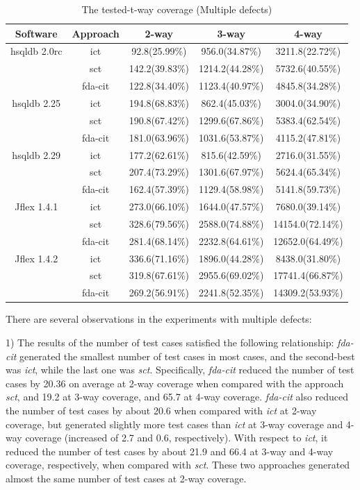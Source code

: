 \documentclass[journal,12pt,onecolumn,draftclsnofoot,]{IEEEtran}
\begin{document}
\begin{table}[ht]
\caption{The tested-t-way coverage (Multiple defects)}
\label{multiple_tdefects_tested-t-way}
\centering
\begin{tabular}{|c|c|c|c|c|} \hline
Software&  Approach & 2-way & 3-way & 4-way\\ \hline
hsqldb 2.0rc	&ict	&92.8(25.99\%)	&956.0(34.87\%)	&3211.8(22.72\%)	\\
	&sct	&142.2(39.83\%)	&1214.2(44.28\%)	&5732.6(40.55\%)	\\
	&fda-cit	&122.8(34.40\%)	&1123.4(40.97\%)	&4845.8(34.28\%)	\\  \hline
hsqldb 2.25	&ict	&194.8(68.83\%)	&862.4(45.03\%)	&3004.0(34.90\%)	\\
	&sct	&190.8(67.42\%)	&1299.6(67.86\%)	&5383.4(62.54\%)	\\
	&fda-cit	&181.0(63.96\%)	&1031.6(53.87\%)	&4115.2(47.81\%)	\\  \hline
hsqldb 2.29	&ict	&177.2(62.61\%)	&815.6(42.59\%)	&2716.0(31.55\%)	\\
	&sct	&207.4(73.29\%)	&1301.6(67.97\%)	&5624.4(65.34\%)	\\
	&fda-cit	&162.4(57.39\%)	&1129.4(58.98\%)	&5141.8(59.73\%)	\\  \hline
Jflex 1.4.1	&ict	&273.0(66.10\%)	&1644.0(47.57\%)	&7680.0(39.14\%)	\\
	&sct	&328.6(79.56\%)	&2588.0(74.88\%)	&14154.0(72.14\%)	\\
	&fda-cit	&281.4(68.14\%)	&2232.8(64.61\%)	&12652.0(64.49\%)	\\  \hline
Jflex 1.4.2	&ict	&336.6(71.16\%)	&1896.0(44.28\%)	&8438.0(31.80\%)	\\
	&sct	&319.8(67.61\%)	&2955.6(69.02\%)	&17741.4(66.87\%)	\\
	&fda-cit	&269.2(56.91\%)	&2241.8(52.35\%)	&14309.2(53.93\%)	\\  \hline
\end{tabular}
\end{table}

There are several observations in the experiments with multiple defects:

1) The results of the number of test cases satisfied the following relationship:  \emph{fda-cit} generated the smallest number of test cases {\color{red} in most cases}, and the second-best was \emph{ict}, while the last one was \emph{sct}.  Specifically, \emph{fda-cit} reduced the number of test cases by 20.36 on average at 2-way coverage when compared with the approach \emph{sct}, and 19.2 at 3-way coverage, and 65.7 at 4-way coverage. \emph{fda-cit} also reduced the number of test cases by about 20.6 when compared with \emph{ict} at 2-way coverage, but generated slightly more test cases than \emph{ict} at 3-way coverage and 4-way coverage (increased of 2.7 and 0.6, respectively). With respect to \emph{ict}, it reduced the number of test cases by about 21.9 and 66.4 at 3-way and 4-way coverage, respectively, when compared with \emph{sct}. These two approaches generated almost the same number of test cases at 2-way coverage.
\end{document}
